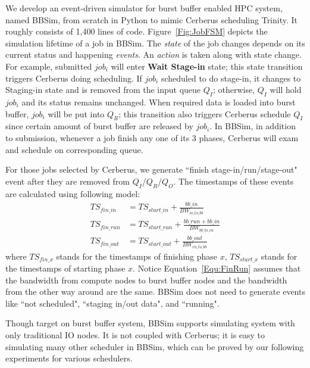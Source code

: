We develop an event-driven simulator for burst buffer enabled HPC system, named BBSim,
from scratch in Python to mimic Cerberus scheduling Trinity.
It roughly consists of 1,400 lines of code.
Figure~\ref{Fig:JobFSM} depicts the simulation lifetime of a job in BBSim.
The \textit{state} of the job changes depends on its current status and
happening \textit{events}.
An \textit{action} is taken along with state change.
For example, submitted $job_i$ will enter \textbf{Wait Stage-in} state;
this state transition triggers Cerberus doing scheduling.
If $job_i$ scheduled to do stage-in, it changes to Staging-in state
and is removed from the input queue $Q_I$;
otherwise, $Q_I$ will hold $job_i$ and its status remains unchanged.
When required data is loaded into burst buffer, $job_i$ will be put into $Q_R$;
this transition also triggers Cerberus schedule $Q_I$ since certain amount of
burst buffer are released by $job_i$.
In BBSim, in addition to submission, whenever a job finish any one of its 3 phases,
Cerberus will exam and schedule on corresponding queue.

For those jobs selected by Cerberus,
we generate ``finish stage-in/run/stage-out" event after
they are removed from $Q_I$/$Q_R$/$Q_O$.
The timestamps of these events are calculated using following model:
\begin{align}
        TS_{fin\_in} &= TS_{start\_in} + \frac{bb\_in}{BW_{io\_to\_bb}}\label{Equ:FinIn} \\
        TS_{fin\_run} &= TS_{start\_run} + \frac{bb\_run + bb\_in}{BW_{bb\_to\_cn}}\label{Equ:FinRun} \\
        TS_{fin\_out} &= TS_{start\_out} + \frac{bb\_out}{BW_{cn\_to\_bb}} \label{Equ:FinOut}
\end{align}
where $TS_{fin\_x}$ stands for the timestamps of finishing phase $x$,
$TS_{start\_x}$ stands for the timestamps of starting phase $x$.
Notice Equation~\ref{Equ:FinRun} assumes that the bandwidth from compute nodes to
burst buffer nodes and the bandwidth from the other way around are the same.
BBSim does not need to generate events like ``not scheduled",
``staging in/out data", and ``running".

Though target on burst buffer system, BBSim supports simulating system with only
traditional IO nodes.
It is not coupled with Cerberus; it is easy to simulating many other scheduler in BBSim,
which can be proved by our following experiments for various schedulers.

